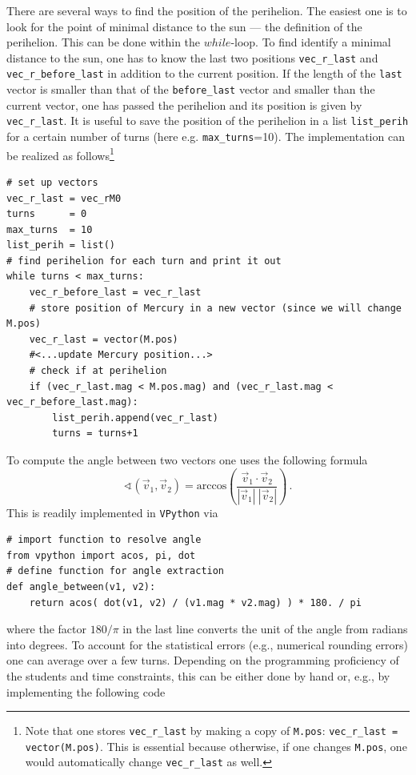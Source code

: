 \documentclass[12pt,ngerman,american]{iopart}
\newcommand{\code}[1]{{\scriptsize\colorbox{light-gray}{\texttt{#1}}}}
\begin{document}
There are several ways to find the position of the perihelion.
The easiest one is to look for the point of minimal distance to the sun --- the definition of the perihelion.
This can be done within the $while$-loop.
To find identify a minimal distance to the sun, one has to know the last two positions \texttt{vec\_r\_last} and \texttt{vec\_r\_before\_last} in addition to the current position.
If the length of the \texttt{last} vector is smaller than that of the \texttt{before\_last} vector and smaller than the current vector, one has passed the perihelion and its position is given by \texttt{vec\_r\_last}.
It is useful to save the position of the perihelion in a list \texttt{list\_perih} for a certain number of turns (here e.g. \texttt{max\_turns}=10).
The implementation can be realized as follows\footnote{%
	Note that one stores \code{vec\_r\_last} by making a copy of \code{M.pos}: \code{vec\_r\_last = vector(M.pos)}.
	This is essential because otherwise, if one changes \code{M.pos}, one would automatically change \code{vec\_r\_last} as well.
}
\begin{lstlisting}
# set up vectors
vec_r_last = vec_rM0
turns      = 0
max_turns  = 10
list_perih = list()
# find perihelion for each turn and print it out
while turns < max_turns:
	vec_r_before_last = vec_r_last
	# store position of Mercury in a new vector (since we will change M.pos)
	vec_r_last = vector(M.pos)
	#<...update Mercury position...>
	# check if at perihelion
	if (vec_r_last.mag < M.pos.mag) and (vec_r_last.mag < vec_r_before_last.mag):
		list_perih.append(vec_r_last)
		turns = turns+1
\end{lstlisting}
To compute the angle between two vectors one uses the following
formula
 \begin{equation}
 	\sphericalangle(\vec{v}_{1},\vec{v}_2) = \mathrm{arccos} \left( \frac{\vec{v}_{1} \cdot \vec{v}_2}{|\vec{v}_{1}|\:|\vec{v}_2|} \right)
	\, .
 \end{equation}
This is readily implemented in \texttt{VPython} via
\begin{lstlisting}
# import function to resolve angle
from vpython import acos, pi, dot
# define function for angle extraction
def angle_between(v1, v2):
	return acos( dot(v1, v2) / (v1.mag * v2.mag) ) * 180. / pi
\end{lstlisting}
where the factor $180/\pi$ in the last line converts the unit of the angle from radians into degrees.
To account for the statistical errors (e.g., numerical rounding errors) one can average over a few turns.
Depending on the programming proficiency of the students and time constraints, this can be either done by hand or, e.g., by implementing the following code
\end{document}
